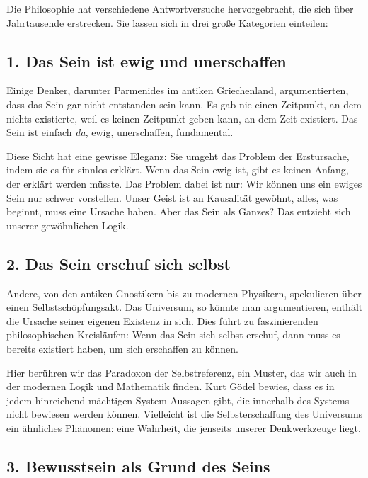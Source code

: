 Die Philosophie hat verschiedene Antwortversuche hervorgebracht, die sich über Jahrtausende erstrecken. Sie lassen sich in drei große Kategorien einteilen:

\subsection*{1. Das Sein ist ewig und unerschaffen}

Einige Denker, darunter Parmenides im antiken Griechenland, argumentierten, dass das Sein gar nicht \glqq entstanden\grqq{} sein kann. Es gab nie einen Zeitpunkt, an dem nichts existierte, weil es keinen Zeitpunkt geben kann, an dem Zeit existiert. Das Sein ist einfach \emph{da}, ewig, unerschaffen, fundamental.

Diese Sicht hat eine gewisse Eleganz: Sie umgeht das Problem der Erstursache, indem sie es für sinnlos erklärt. Wenn das Sein ewig ist, gibt es keinen Anfang, der erklärt werden müsste. Das Problem dabei ist nur: Wir können uns ein ewiges Sein nur schwer vorstellen. Unser Geist ist an Kausalität gewöhnt, alles, was beginnt, muss eine Ursache haben. Aber das Sein als Ganzes? Das entzieht sich unserer gewöhnlichen Logik.

\subsection*{2. Das Sein erschuf sich selbst}

Andere, von den antiken Gnostikern bis zu modernen Physikern, spekulieren über einen Selbstschöpfungsakt. Das Universum, so könnte man argumentieren, enthält die Ursache seiner eigenen Existenz in sich. Dies führt zu faszinierenden philosophischen Kreisläufen: Wenn das Sein sich selbst erschuf, dann muss es bereits existiert haben, um sich erschaffen zu können.

Hier berühren wir das Paradoxon der Selbstreferenz, ein Muster, das wir auch in der modernen Logik und Mathematik finden. Kurt Gödel bewies, dass es in jedem hinreichend mächtigen System Aussagen gibt, die innerhalb des Systems nicht bewiesen werden können. Vielleicht ist die Selbsterschaffung des Universums ein ähnliches Phänomen: eine Wahrheit, die jenseits unserer Denkwerkzeuge liegt.

\subsection*{3. Bewusstsein als Grund des Seins}

